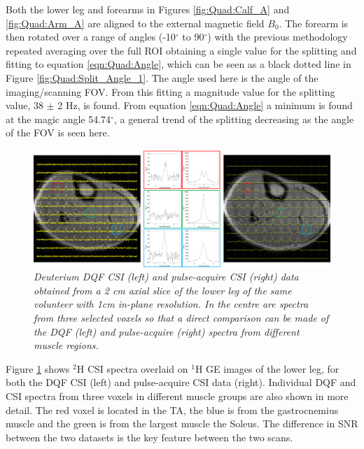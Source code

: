 \documentclass[class=article, crop=false]{standalone}
\begin{document}
Both the lower leg and forearms in Figures \ref{fig:Quad:Calf_A} and \ref{fig:Quad:Arm_A} are aligned to the external magnetic field $B_0$. The forearm is then rotated over a range of angles (-10$^\circ$ to 90$^\circ$) with the previous methodology repeated averaging over the full ROI obtaining a single value for the splitting and fitting to equation \ref{eqn:Quad:Angle}, which can be seen as a black dotted line in Figure \ref{fig:Quad:Split_Angle_1}. The angle used here is the angle of the imaging/scanning FOV. From this fitting a magnitude value for the splitting value, 38 $\pm$ 2 Hz, is found. From equation \ref{eqn:Quad:Angle} a minimum is found at the magic angle 54.74$^\circ$, a general trend of the splitting decreasing as the angle of the FOV is seen here.

\begin{figure}
    \centering
    \includegraphics[width=1\textwidth]{Figures/Quad/SQFDQF_CSI_1.png}
    \caption{\textit{Deuterium DQF CSI (left) and pulse-acquire CSI (right) data obtained from a 2 cm axial slice of the lower leg of the same volunteer with 1cm in-plane resolution. In the centre are spectra from three selected voxels so that a direct comparison can be made of the DQF (left) and pulse-acquire (right) spectra from different muscle regions.}}
    \label{fig:Quad:SQFDQF_1}
\end{figure}

Figure \ref{fig:Quad:SQFDQF_1} shows $^2$H CSI spectra overlaid on $^1$H GE images of the lower leg, for both the DQF CSI (left) and pulse-acquire CSI data (right). Individual DQF and CSI spectra from three voxels in different muscle groups are also shown in more detail. The red voxel is located in the TA, the blue is from the gastrocnemius muscle and the green is from the largest muscle the Soleus. The difference in SNR between the two datasets is the key feature between the two scans.
\end{document}
